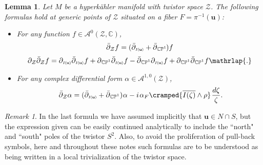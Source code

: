 \documentclass[11pt]{amsart}
\newtheorem{lemma}[theorem]{Lemma}
\theoremstyle{remark}
\newtheorem*{remark}{Remark}
\theoremstyle{remark}
\theoremstyle{definition}
\theoremstyle{definition}
\theoremstyle{definition}
\newcommand{\Iu}{\scriptscriptstyle{I\nhp(\nhp\mathbf{u}\hspace{-0.25pt})}} %
\newcommand{\0}{{\scriptstyle 0'}} %
\newcommand{\1}{{\scriptstyle 1'}}
\newcommand{\pt}{\hspace{1pt}} %
\newcommand{\hp}{\hspace{0.5pt}} %
\newcommand{\npt}{\hspace{-1pt}} %
\newcommand{\nhp}{\hspace{-0.5pt}} %
\begin{document}
\begin{lemma} \label{Dolbeault_Z}
Let $M$ be a hyperk\"ahler manifold with twistor space $\mathcal{Z}$. The following formulas hold at generic points of $\mathcal{Z}$ situated on a fiber $F = \pi^{-1}(\mathbf{u})$:
\begin{itemize}
\setlength{\itemsep}{0pt}
\item[1.] For any function $f \in \mathscr{A}^0(\mathcal{Z},\mathbb{C})$, %
\begin{gather}
\bar{\partial}_{\mathcal{Z}} f = (\bar{\partial}_{\Iu} + \bar{\partial}_{\hp\smash{\mathbb{CP}^1}} \npt) f \label{del_bar_Z_fct} \\[2pt]
\partial_{\mathcal{Z}}\bar{\partial}_{\mathcal{Z}} f = \partial_{\Iu} \bar{\partial}_{\Iu} f + \partial_{\hp\smash{\mathbb{CP}^1}}\bar{\partial}_{\Iu} f - \bar{\partial}_{\hp\smash{\mathbb{CP}^1}} \partial_{\Iu} f + \partial_{\hp\smash{\mathbb{CP}^1}}\bar{\partial}_{\hp\smash{\mathbb{CP}^1}} f \mathrlap{.} \label{delZ_delZbar}
\end{gather}

\item[2.] For any complex differential form $\alpha \in \mathscr{A}^{1,0}(\mathcal{Z})$, %
\begin{equation} \label{d_bar_(1,0)}
\bar{\partial}_{\mathcal{Z}} \alpha = (\bar{\partial}_{\Iu} + \bar{\partial}_{\hp\smash{\mathbb{CP}^1}}) \hp \alpha -  i\pt \alpha_F \cramped{\overline{I(\zeta)} \wedge \rho} \pt \frac{d\zeta}{\zeta}\rlap{.}
\end{equation}

\end{itemize}
\end{lemma} 

\begin{remark}
In the last formula we have assumed implicitly that $\mathbf{u} \in N \cap S$, but the expression given can be easily continued analytically to include the ``north" and ``south" poles of the twistor $S^2$. Also, to avoid the proliferation of pull-back symbols, here and throughout these notes such formulas are to be understood as being written in a local trivialization of the twistor space.
\end{remark}
\end{document}
